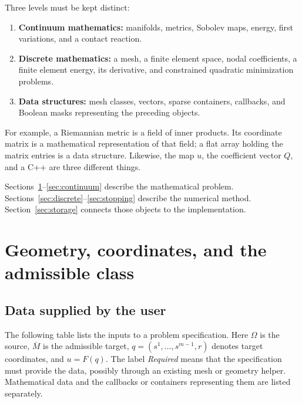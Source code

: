 \documentclass[11pt,a4paper]{article}
\newcommand{\code}[1]{\texttt{\detokenize{#1}}}
\begin{document}
Three levels must be kept distinct:
\begin{enumerate}
  \item \textbf{Continuum mathematics:} manifolds, metrics, Sobolev maps,
  energy, first variations, and a contact reaction.
  \item \textbf{Discrete mathematics:} a mesh, a finite element space,
  nodal coefficients, a finite element energy, its derivative, and
  constrained quadratic minimization problems.
  \item \textbf{Data structures:} mesh classes, vectors, sparse containers,
  callbacks, and Boolean masks representing the preceding objects.
\end{enumerate}
For example, a Riemannian metric is a field of inner products. Its coordinate
matrix is a mathematical representation of that field; a flat array holding
the matrix entries is a data structure. Likewise, the map \(u\), the
coefficient vector \(Q\), and a C++ \code{std::map} are three different things.

Sections~\ref{sec:geometry}--\ref{sec:continuum} describe the mathematical
problem. Sections~\ref{sec:discrete}--\ref{sec:stopping} describe the numerical
method. Section~\ref{sec:storage} connects those objects to the implementation.

\clearpage
\section{Geometry, coordinates, and the admissible class}
\label{sec:geometry}

\subsection{Data supplied by the user}
\label{sec:input-data}
The following table lists the inputs to a problem specification. Here
\(\Omega\) is the source, \(\overline M\) is the admissible target,
\(q=(s^1,\ldots,s^{m-1},r)\) denotes target coordinates, and \(u=F(q)\).
The label \emph{Required} means that the specification must provide the
data, possibly through an existing mesh or geometry helper. Mathematical
data and the callbacks or containers representing them are listed separately.
\end{document}
